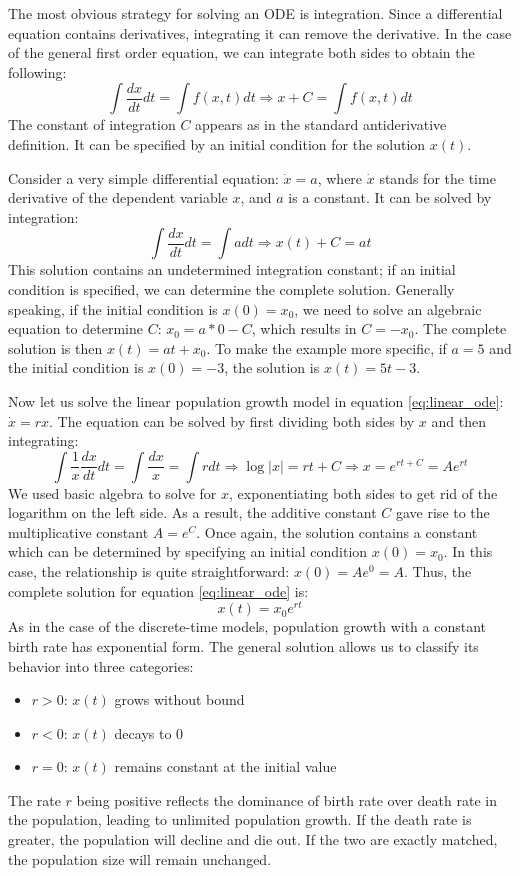 \documentclass[11pt]{book}
\begin{document}
The most obvious strategy for solving an ODE is integration. Since a differential equation contains derivatives, integrating it can remove the derivative. In the case of the general first order equation, we can integrate both sides to obtain the following:
$$ \int \frac{dx}{dt} dt = \int f(x,t) dt \Rightarrow x + C = \int f(x,t) dt$$
The constant of integration $C$ appears as in the standard antiderivative definition. It can be specified by an initial condition for the solution $x(t)$.

Consider a very simple differential equation: $\dot x  = a$, where $\dot x$ stands for the time derivative of the dependent variable $x$, and $a$ is a constant. It can be solved by integration:
$$ \int \frac{dx}{dt} dt  = \int a dt  \Rightarrow x(t) + C = at $$
This solution contains an undetermined integration constant; if an initial condition is specified, we can determine the complete solution. Generally speaking, if the initial condition is $x(0) = x_0$, we need to solve an algebraic equation to determine $C$:  $x_0 = a*0 - C$, which results in $C = -x_0$. The complete solution is then $x(t) = at + x_0$. To make the example more specific, if $a = 5$ and the initial condition is $x(0) = -3$, the solution is $x(t) = 5t -3$.

Now let us solve the linear population growth model in equation \ref{eq:linear_ode}: $\dot x = rx$. The equation can be solved by  first dividing  both sides by $x$ and then integrating:
$$ \int \frac{1}{x} \frac{d x}{dt}  dt = \int \frac{dx}{x} = \int r dt \Longrightarrow \log |x| = rt + C  \Longrightarrow  x =  e^{rt+C} = Ae^{rt}$$
We used basic algebra to solve for $x$, exponentiating both sides to get rid of the logarithm on the left side. As a result, the additive constant $C$ gave rise to the multiplicative constant $A=e^C$. Once again, the solution contains a constant which can be determined by specifying an initial condition $x(0) = x_0$. In this case, the relationship is quite straightforward: $x(0) = A e^0 = A$. Thus, the complete solution for equation \ref{eq:linear_ode} is:
$$ x(t) = x_0e^{rt}$$
As in the case of the discrete-time models, population growth with a constant birth rate has exponential form. The general solution  allows us to classify its behavior into three categories:
\begin{itemize}
\item $ r > 0$: $x(t)$ grows without bound
\item $ r < 0$: $x(t)$ decays to 0
\item $ r = 0 $: $x(t)$ remains constant at the initial value
\end{itemize}
The rate $r$ being positive reflects the dominance of birth rate over death rate in the population, leading to unlimited population growth. If the death rate is greater, the population will decline and die out. If the two are exactly matched, the population size will remain unchanged.
\end{document}
